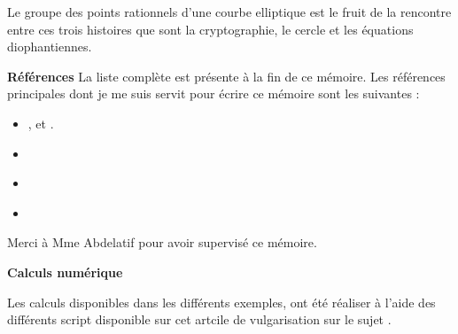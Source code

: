 Le groupe des points rationnels d'une courbe elliptique est le fruit de la rencontre entre ces trois
histoires que sont la cryptographie, le cercle et les équations diophantiennes.

\begin{center}
    \textbf{Références}
    La liste complète est présente à la fin de ce mémoire. Les références principales
    dont je me suis servit pour écrire ce mémoire sont les suivantes :
    \begin{itemize}
        \item \cite[]{KrausCF}, \cite[]{KrausCP} et \cite[]{KrausCE}. 
        \item \cite[]{Delaunay} 
        \item \cite[]{Baigneres2003} 
        \item \cite{Deglise2013} 
    \end{itemize}

\end{center}

\begin{center}
    Merci à Mme Abdelatif pour avoir supervisé ce mémoire.
\end{center}

\begin{center}
    \textbf{Calculs numérique}

    Les calculs disponibles dans les différents exemples, ont été réaliser à l'aide des
    différents script disponible sur cet artcile de vulgarisation sur le sujet \cite[]{Kun2014}.
\end{center}

